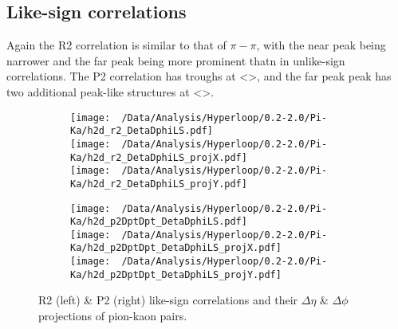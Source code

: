 \documentclass[12pt,a4paper,twoside]{report}
\begin{document}
\subsection{Like-sign correlations}
Again the R2 correlation is similar to that of $\pi-\pi$, with the near peak being narrower and the far peak being more prominent thatn in unlike-sign correlations. The P2 correlation has troughs at <>, and the far peak peak has two additional peak-like structures at <>.
\begin{figure}[H]
	\begin{subfigure}{0.49\linewidth}
		\texttt{[image: ~/Data/Analysis/Hyperloop/0.2-2.0/Pi-Ka/h2d\_r2\_DetaDphiLS.pdf]}\\
		\texttt{[image: ~/Data/Analysis/Hyperloop/0.2-2.0/Pi-Ka/h2d\_r2\_DetaDphiLS\_projX.pdf]}\\
		\texttt{[image: ~/Data/Analysis/Hyperloop/0.2-2.0/Pi-Ka/h2d\_r2\_DetaDphiLS\_projY.pdf]}\\
	\end{subfigure}
	\begin{subfigure}{0.49\linewidth}
		\texttt{[image: ~/Data/Analysis/Hyperloop/0.2-2.0/Pi-Ka/h2d\_p2DptDpt\_DetaDphiLS.pdf]}\\
		\texttt{[image: ~/Data/Analysis/Hyperloop/0.2-2.0/Pi-Ka/h2d\_p2DptDpt\_DetaDphiLS\_projX.pdf]}\\
		\texttt{[image: ~/Data/Analysis/Hyperloop/0.2-2.0/Pi-Ka/h2d\_p2DptDpt\_DetaDphiLS\_projY.pdf]}\\
	\end{subfigure}
	\caption{R2 (left) \& P2 (right) like-sign correlations and their $\Delta\eta$ \& $\Delta\phi$ projections of pion-kaon pairs.}
\end{figure}
\end{document}
